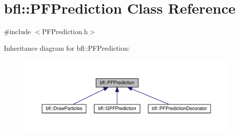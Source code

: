 \hypertarget{classbfl_1_1PFPrediction}{}\section{bfl\+:\+:P\+F\+Prediction Class Reference}
\label{classbfl_1_1PFPrediction}


{\ttfamily \#include $<$P\+F\+Prediction.\+h$>$}



Inheritance diagram for bfl\+:\+:P\+F\+Prediction\+:
\nopagebreak
\begin{figure}[H]
\begin{center}
\leavevmode
\includegraphics[width=350pt]{classbfl_1_1PFPrediction__inherit__graph}
\end{center}
\end{figure}
